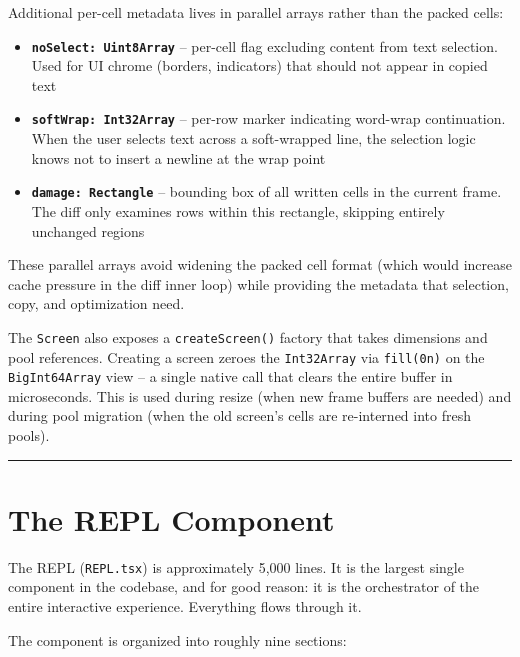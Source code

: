 \documentclass[
  english,
  11pt,
  letterpaper,
]{book}
\providecommand{\tightlist}{%
  \setlength{\itemsep}{0pt}\setlength{\parskip}{0pt}}
\begin{document}
Additional per-cell metadata lives in parallel arrays rather than the
packed cells:

\begin{itemize}
\tightlist
\item
  \textbf{\texttt{noSelect:\ Uint8Array}} -- per-cell flag excluding
  content from text selection. Used for UI chrome (borders, indicators)
  that should not appear in copied text
\item
  \textbf{\texttt{softWrap:\ Int32Array}} -- per-row marker indicating
  word-wrap continuation. When the user selects text across a
  soft-wrapped line, the selection logic knows not to insert a newline
  at the wrap point
\item
  \textbf{\texttt{damage:\ Rectangle}} -- bounding box of all written
  cells in the current frame. The diff only examines rows within this
  rectangle, skipping entirely unchanged regions
\end{itemize}

These parallel arrays avoid widening the packed cell format (which would
increase cache pressure in the diff inner loop) while providing the
metadata that selection, copy, and optimization need.

The \texttt{Screen} also exposes a \texttt{createScreen()} factory that
takes dimensions and pool references. Creating a screen zeroes the
\texttt{Int32Array} via \texttt{fill(0n)} on the \texttt{BigInt64Array}
view -- a single native call that clears the entire buffer in
microseconds. This is used during resize (when new frame buffers are
needed) and during pool migration (when the old screen's cells are
re-interned into fresh pools).

\begin{center}\rule{0.5\linewidth}{0.5pt}\end{center}

\section{The REPL Component}\label{the-repl-component}

The REPL (\texttt{REPL.tsx}) is approximately 5,000 lines. It is the
largest single component in the codebase, and for good reason: it is the
orchestrator of the entire interactive experience. Everything flows
through it.

The component is organized into roughly nine sections:
\end{document}
